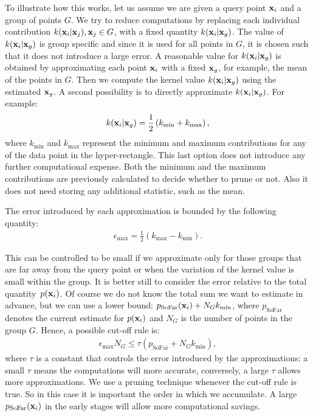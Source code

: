 To illustrate how this works, let us assume we are given a query point $\mathbf{x}_i$ and a group of points $G$. We try to reduce computations by replacing each individual contribution $k(\mathbf{x}_i|\mathbf{x}_j), \mathbf{x}_j\in G$, with a fixed quantity $k(\mathbf{x}_i|\mathbf{x}_g)$. The value of $k(\mathbf{x}_i|\mathbf{x}_g)$ is group specific and since it is used for all points in $G$, it is chosen such that it does not introduce a large error. 
A reasonable value for $k(\mathbf{x}_i|\mathbf{x}_g)$ is obtained by
approximating each point $\mathbf{x}_i$ with a fixed $\mathbf{x}_g$, for example, the mean of the points in $G$. Then we compute the kernel value $k(\mathbf{x}_i|\mathbf{x}_g)$ using the estimated $\mathbf{x}_g$. A second possibility is to directly approximate $k(\mathbf{x}_i|\mathbf{x}_g)$. For example:
\begin{align}
  k(\mathbf{x}_i|\mathbf{x}_g) = \frac{1}{2}\left( k_{\min} + k_{\max} \right),
  \label{eq:approx-rule}
\end{align} 
where $k_{\min}$ and $k_{\max}$ represent the minimum and maximum contributions for any of the data point in the hyper-rectangle. This last option does not introduce any further computational expense. Both the minimum and the maximum contributions are previously calculated to decide whether to prune or not. Also it does not need storing any additional statistic, such as the mean.

The error introduced by each approximation is bounded by the following quantity:
\begin{align}
\epsilon_{\max} = \frac{1}{2}\left(k_{\max} - k_{\min}\right). 
\end{align}

This can be controlled to be small if we approximate only for those groups that are far away from the query point or when the variation of the kernel value is small within the group.
It is better still to consider the error relative to the total quantity~$p(\mathbf{x}_i)$. Of course we do not know the total sum we want to estimate in advance, but we can use a lower bound: $p_{\text{SoFar}}(\mathbf{x}_i) + N_Gk_{\min}$, where $p_{\text{SoFar}}$ denotes the current estimate for $p(\mathbf{x}_i)$ and $N_G$ is the number of points in the group $G$. Hence, a possible cut-off rule is: 
\begin{align}
  \epsilon_{\max}N_G \le \tau (p_{\text{SoFar}} + N_Gk_{\min}),
\end{align}
where $\tau$ is a constant that controls the error introduced by the approximations: a small $\tau$ means the computations will more accurate, conversely, a large $\tau$ allows more approximations. We use a pruning technique whenever the cut-off rule is true. So in this case it is important the order in which we accumulate. A large $p_{\text{SoFar}}(\mathbf{x}_i)$ in the early stages will allow more computational savings.


